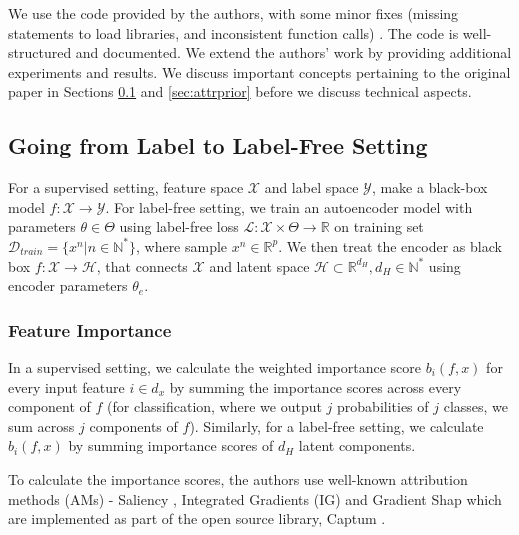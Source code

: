 We use the code provided by the authors, with some minor fixes (missing statements to load libraries, and inconsistent function calls) \citep{Jonathan3:online}. The code is well-structured and documented. We extend the authors' work by providing additional experiments and results. We discuss important concepts pertaining to the original paper in Sections \ref{l2lf} and \ref{sec:attrprior} before we discuss technical aspects. 

\subsection{Going from Label to Label-Free Setting}
\label{l2lf} 
For a supervised setting, feature space $\mathcal{X}$ and label space $\mathcal{Y}$, make a black-box model $f: \mathcal{X}\rightarrow \mathcal{Y}$. For label-free setting,
we train an autoencoder model with parameters $\theta \in \Theta$ using label-free loss $\mathcal{L}: \mathcal{X} \times \Theta \rightarrow \mathbb{R}$ on training set $\mathcal{D}_{train} = \{x^n | n \in \mathbb{N}^*\}$, where sample $x^n \in \mathbb{R}^p$. We then treat the encoder as black box $f: \mathcal{X}\rightarrow \mathcal{H}$, that connects $\mathcal{X}$ and latent space $\mathcal{H} \subset \mathbb{R}^{d_H}, d_H \in \mathbb{N}^*$ using encoder parameters $\theta_e$.

\subsubsection{Feature Importance} In a supervised setting, we calculate the weighted importance score $b_i(f,x)$ for every input feature $i \in d_x$ by summing the importance scores across every component of $f$ (for classification, where we output $j$ probabilities of $j$ classes, we sum across $j$ components of $f$). Similarly, for a label-free setting,  we calculate $b_i(f,x)$ by summing importance scores of $d_H$ latent components.

 To calculate the importance scores, the authors use well-known attribution methods (AMs) - Saliency \citep{Saliency}, Integrated Gradients (IG) \citep{IG} and Gradient Shap \citep{shap} which are implemented as part of the open source library, Captum \citep{Captum:online}. 

